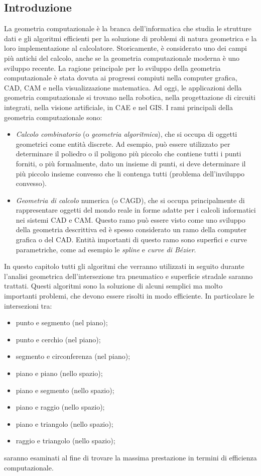 \subsection{Introduzione}
La geometria computazionale è la branca dell'informatica che studia le strutture dati e gli algoritmi efficienti per la soluzione di problemi di natura geometrica e la loro implementazione al calcolatore. Storicamente, è considerato uno dei campi più antichi del calcolo, anche se la geometria computazionale moderna è uno sviluppo recente. La ragione principale per lo sviluppo della geometria computazionale è stata dovuta ai progressi compiuti nella computer grafica, \ac{CAD}, \ac{CAM} e nella visualizzazione matematica. Ad oggi, le applicazioni della geometria computazionale si trovano nella robotica, nella progettazione di circuiti integrati, nella visione artificiale, in \ac{CAE} e nel \ac{GIS}. I rami principali della geometria computazionale sono:
\begin{itemize}
	\item \textit{Calcolo combinatorio} (o \textit{geometria algoritmica}), che si occupa di oggetti geometrici come entità discrete. Ad esempio, può essere utilizzato per determinare il poliedro o il poligono più piccolo che contiene tutti i punti forniti, o più formalmente, dato un insieme di punti, si deve determinare il più piccolo insieme convesso che li contenga tutti (problema dell'inviluppo convesso).
	\item \textit{Geometria di calcolo} numerica (o \ac{CAGD}), che si occupa principalmente di rappresentare oggetti del mondo reale in forme adatte per i calcoli informatici nei sistemi \ac{CAD} e \ac{CAM}. Questo ramo può essere visto come uno sviluppo della geometria descrittiva ed è spesso considerato un ramo della computer grafica o del \ac{CAD}. Entità importanti di questo ramo sono superfici e curve parametriche, come ad esempio le \textit{spline} e \textit{curve di Bézier}.
\end{itemize}

In questo capitolo tutti gli algoritmi che verranno utilizzati in seguito durante l'analisi geometrica dell'intersezione tra pneumatico e superficie stradale saranno trattati. Questi algoritmi sono la soluzione di alcuni semplici ma molto importanti problemi, che devono essere risolti in modo efficiente. In particolare le intersezioni tra:
\begin{itemize}
	\item punto e segmento (nel piano);
	\item punto e cerchio (nel piano);
	\item segmento e circonferenza (nel piano);
	\item piano e piano (nello spazio);
	\item piano e segmento (nello spazio);
	\item piano e raggio (nello spazio);
	\item piano e triangolo (nello spazio);
	\item raggio e triangolo (nello spazio);
\end{itemize}
saranno esaminati al fine di trovare la massima prestazione in termini di efficienza computazionale.
%

